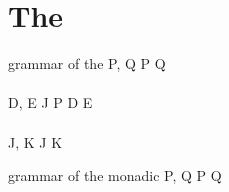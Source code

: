 \section{The \JoinCalc}

\begin{JDef}{grammar of the \joincalc}
  P, Q
  \grmr {}
  \altn {}
  \altn P \jpar Q
  \altn \jnullproc
  \\ \\
  D, E
  \grmr J \jrct P
  \altn D \jcon E
  \altn \jnulldef
  \\ \\
  J, K
  \grmr {}
  \altn J \jpat K
\end{JDef}

\begin{JDef}{grammar of the monadic \joincalc}
  P, Q
  \grmr {}
  \altn P \jpar Q
  \altn {}
\end{JDef}

